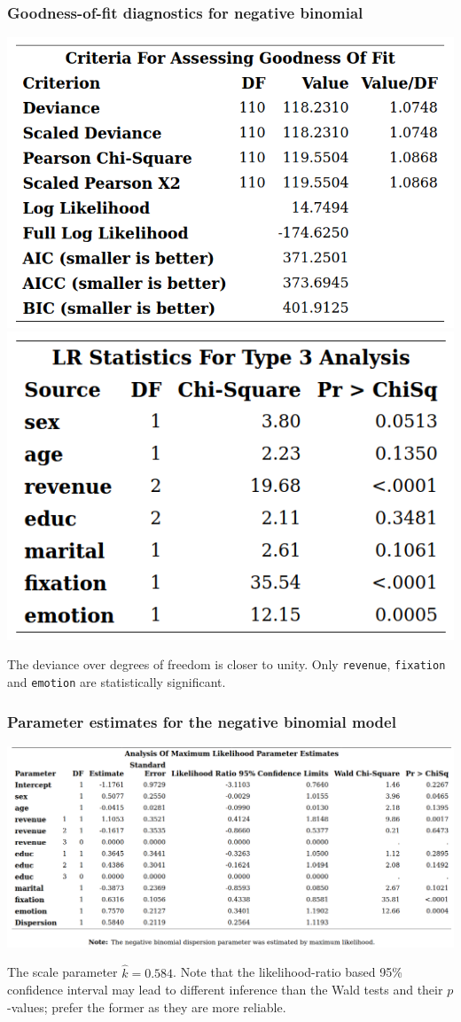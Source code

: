 \documentclass{beamer}
\begin{document}
\begin{frame}[fragile]
\frametitle{Goodness-of-fit diagnostics for negative binomial}
\begin{center}
\includegraphics[width = 0.55\linewidth]{img/c4/slides8-e6}
\includegraphics[width = 0.44\linewidth]{img/c4/slides8-e7}
\end{center}
The deviance over degrees of freedom is closer to unity. Only \texttt{revenue}, \texttt{fixation} and \texttt{emotion} are statistically significant.
\end{frame}

\begin{frame}[fragile]
\frametitle{Parameter estimates for the negative binomial model}
\begin{center}
\includegraphics[width = 0.99\linewidth]{img/c4/slides8-e8}
\end{center}
{\footnotesize 
The scale parameter $\hat{k} = 0.584$. Note that the likelihood-ratio based 95\% confidence interval may lead to different inference than the Wald tests and their $p$-values; prefer the former as they are more reliable.


}
\end{frame}
\end{document}
